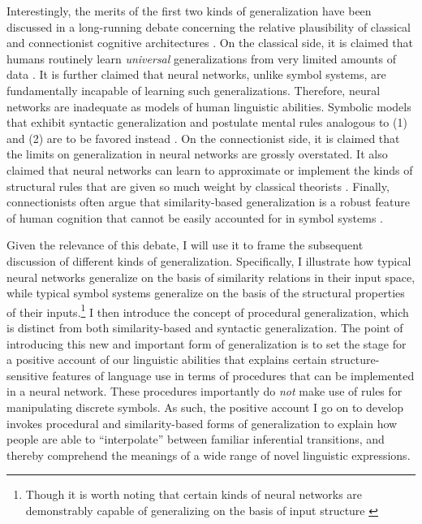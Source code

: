 Interestingly, the merits of the first two kinds of generalization have been discussed in a long-running debate concerning the relative plausibility of classical and connectionist cognitive architectures \citep{FodorPylyshyn:1988,SmolenskyLegendre:2006}. On the classical side, it is claimed that humans routinely learn \textit{universal} generalizations from very limited amounts of data \citep{Hadley:2009,Marcus:1998}. It is further claimed that neural networks, unlike symbol systems, are fundamentally incapable of learning such generalizations. Therefore, neural networks are inadequate as models of human linguistic abilities. Symbolic models that exhibit syntactic generalization and postulate mental rules analogous to (1) and (2) are to be favored instead \citep{FodorPylyshyn:1988}. On the connectionist side, it is claimed that the limits on generalization in neural networks are grossly overstated. It also claimed that neural networks can learn to approximate or implement the kinds of structural rules that are given so much weight by classical theorists \citep{Plate:2003,SmolenskyLegendre:2006,Eliasmith:2013,Rasmussen:2011,Gayler:2004}. Finally, connectionists often argue that similarity-based generalization is a robust feature of human cognition that cannot be easily accounted for in symbol systems \citep{McClelland:2010}. 

Given the relevance of this debate, I will use it to frame the subsequent discussion of different kinds of generalization. Specifically, I illustrate how typical neural networks generalize on the basis of similarity relations in their input space, while typical symbol systems generalize on the basis of the structural properties of their inputs.\footnote{Though it is worth noting that certain kinds of neural networks are demonstrably capable of generalizing on the basis of input structure \citep{Rasmussen:2011,Eliasmith:2013}} I then introduce the concept of procedural generalization, which is distinct from both similarity-based and syntactic generalization. The point of introducing this new and important form of generalization is to set the stage for a positive account of our linguistic abilities that explains certain structure-sensitive features of language use in terms of procedures that can be implemented in a neural network. These procedures importantly do \textit{not} make use of rules for manipulating discrete symbols. As such, the positive account I go on to develop invokes procedural and similarity-based forms of generalization to explain how people are able to ``interpolate'' between familiar inferential transitions, and thereby comprehend the meanings of a wide range of novel linguistic expressions.

